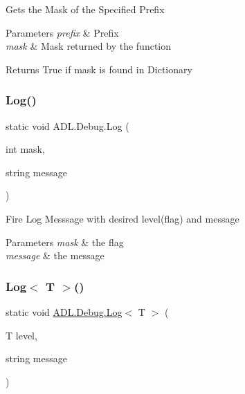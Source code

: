 Gets the Mask of the Specified Prefix 


\begin{DoxyParams}{Parameters}
{\em prefix} & Prefix\\
\hline
{\em mask} & Mask returned by the function\\
\hline
\end{DoxyParams}
\begin{DoxyReturn}{Returns}
True if mask is found in Dictionary
\end{DoxyReturn}
\mbox{\label{class_a_d_l_1_1_debug_a169452dbed965a360a23e112ed9956c3}} 
\subsubsection{\texorpdfstring{Log()}{Log()}}
{\footnotesize\ttfamily static void A\+D\+L.\+Debug.\+Log (\begin{DoxyParamCaption}\item[{int}]{mask,  }\item[{string}]{message }\end{DoxyParamCaption})\hspace{0.3cm}{\ttfamily [static]}}



Fire Log Messsage with desired level(flag) and message 


\begin{DoxyParams}{Parameters}
{\em mask} & the flag\\
\hline
{\em message} & the message\\
\hline
\end{DoxyParams}
\mbox{\label{class_a_d_l_1_1_debug_a4162ccb62b2facbc5ab9f981abe6fa3e}} 
\subsubsection{\texorpdfstring{Log$<$ T $>$()}{Log< T >()}}
{\footnotesize\ttfamily static void \mbox{\hyperlink{class_a_d_l_1_1_debug_a169452dbed965a360a23e112ed9956c3}{A\+D\+L.\+Debug.\+Log}}$<$ T $>$ (\begin{DoxyParamCaption}\item[{T}]{level,  }\item[{string}]{message }\end{DoxyParamCaption})\hspace{0.3cm}{\ttfamily [static]}}




